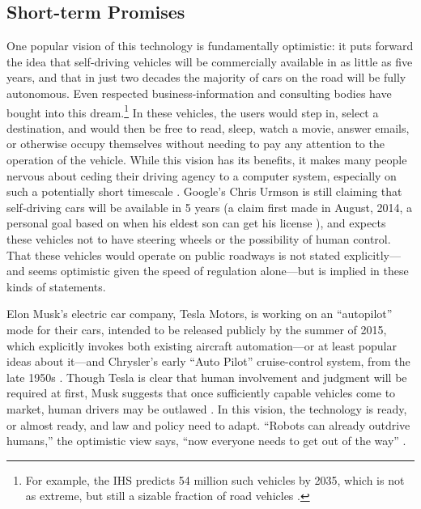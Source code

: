 \subsection{Short-term Promises}

One popular vision of this technology is fundamentally optimistic: it
puts forward the
idea that self-driving vehicles will be commercially available in as little
as five years, and that in just two decades the majority of cars on the road will be
fully autonomous. Even respected business-information and consulting
bodies have bought into this dream.\footnote{For example, the IHS
  predicts 54 million such vehicles by 2035, which is not as extreme,
  but still a sizable fraction of road vehicles \cite{IHSstudy}.} In
these vehicles, the users would 
step in, select a destination, and would then be free to read, sleep,
watch a movie, answer emails, or otherwise occupy themselves without
needing to pay any attention to the operation of the vehicle. While this
vision has its benefits, it makes many people nervous about
ceding their driving agency to a computer system, especially on such a
potentially short timescale \cite{clytton}. Google's Chris Urmson is
still claiming that self-driving cars will be available in 5 years (a
claim first made in August, 2014, a personal goal based on when his
eldest son can get his license \cite{gomesObstacles}), and expects
these vehicles not to have steering wheels or the possibility of human
control. That these vehicles would operate on public roadways is not
stated explicitly---and seems optimistic given the speed of regulation
alone---but is implied in these kinds of statements. 


Elon Musk's electric car company, Tesla Motors, is working on an
``autopilot'' mode for their cars, intended to be released publicly by
the summer of 2015, 
which explicitly invokes both existing aircraft automation---or at
least popular ideas about it---and Chrysler's early ``Auto Pilot''
cruise-control system, from the late 1950s
\cite{kesslerElon}.
Though Tesla is clear that human involvement and judgment will be
required at first, Musk suggests 
that once sufficiently capable vehicles 
come to market, human drivers may be
outlawed \cite{kingGoogle}.
In this vision, the technology is ready, or almost ready, and law and policy need to
adapt. ``Robots can already outdrive humans,'' the optimistic view says, ``now
everyone needs to get out of the way''
\cite{fisherInside}.

